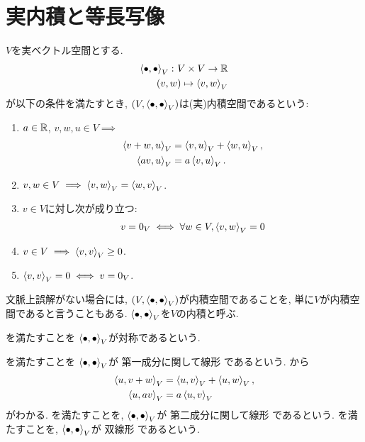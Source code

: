 \section{実内積と等長写像}
\begin{definition}
  $V$を実ベクトル空間とする.
  \begin{align*}
    \Braket{\bullet,\bullet}_V
    \colon
    V\times V \to \mathbb{R}\\
    (v,w) \mapsto\Braket{v,w}_V
  \end{align*}
  が以下の条件を満たすとき,
  $(V,\Braket{\bullet,\bullet}_V)$は(実)内積空間であるという:
  \begin{enumerate}
  \item
    \label{def:inner:item:line}
    $a\in\mathbb{R}$, $v,w,u\in V\implies$
    \begin{align}
      \Braket{v+w,u}_V&=\Braket{v,u}_V+\Braket{w,u}_V,
      \label{def:inner:item:line:1:sum}
      \\
      \Braket{av,u}_V&=a\Braket{v,u}_V.
      \label{def:inner:item:line:1:sca}
    \end{align}
  \item
    \label{def:inner:item:sym}
    $v,w\in V \implies \Braket{v,w}_V=\Braket{w,v}_V$.
  \item 
    \label{def:inner:item:nondege}
    $v\in V$に対し次が成り立つ:
    \begin{align}
      v=0_V
      \iff
      \forall w\in V,\Braket{v,w}_V=0
      \label{def:inner:item:nondege:1}
    \end{align}
  \item
    \label{def:inner:item:semi}
    $v\in V \implies \Braket{v,v}_V\geq 0$.
  \item
    \label{def:inner:item:posi}
    $\Braket{v,v}_V=0\iff v=0_V$.
  \end{enumerate}
\end{definition}
\begin{remark}
  文脈上誤解がない場合には,
  $(V,\Braket{\bullet,\bullet}_V)$が内積空間であることを,
  単に$V$が内積空間であると言うこともある.
  $\Braket{\bullet,\bullet}_V$を$V$の内積と呼ぶ.
\end{remark}
\begin{remark}
  を満たすことを
  $\Braket{\bullet,\bullet}_V$が対称であるという.
\end{remark}
\begin{remark}
  を満たすことを
  $\Braket{\bullet,\bullet}_V$が
  第一成分に関して線形
  であるという.
  から
  \begin{align}
    \Braket{u,v+w}_V&=\Braket{u,v}_V+\Braket{u,w}_V,
    \label{def:inner:item:line:2:sum}
    \\
    \Braket{u,av}_V&=a\Braket{u,v}_V    
    \label{def:inner:item:line:2:sca}
  \end{align}
  がわかる.
  を満たすことを,
  $\Braket{\bullet,\bullet}_V$が
  第二成分に関して線形
  であるという.
  を満たすことを,
  $\Braket{\bullet,\bullet}_V$が
  双線形
  であるという.
\end{remark}
